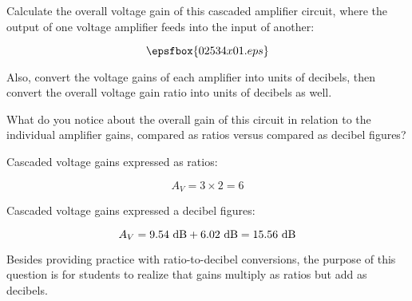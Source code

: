 

Calculate the overall voltage gain of this cascaded amplifier circuit, where the output of one voltage amplifier feeds into the input of another:

$$\epsfbox{02534x01.eps}$$

Also, convert the voltage gains of each amplifier into units of decibels, then convert the overall voltage gain ratio into units of decibels as well.

What do you notice about the overall gain of this circuit in relation to the individual amplifier gains, compared as ratios versus compared as decibel figures?







Cascaded voltage gains expressed as ratios:

$$A_{V} = 3 \times 2 = 6$$

Cascaded voltage gains expressed a decibel figures:

$$A_{V} = 9.54 \hbox{ dB} + 6.02 \hbox{ dB} = 15.56 \hbox{ dB}$$







Besides providing practice with ratio-to-decibel conversions, the purpose of this question is for students to realize that gains multiply as ratios but add as decibels.




